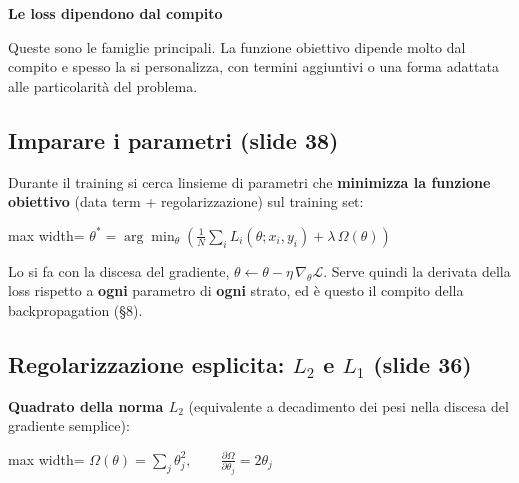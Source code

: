 \documentclass[11pt,a4paper,oneside,openany]{book}
\renewenvironment{quote}{\list{}{\leftmargin=1em\rightmargin=0pt}\item\relax}{\endlist}
\begin{document}
\begin{quote}
\textbf{Le loss dipendono dal compito}
\end{quote}

\begin{quote}
Queste sono le famiglie principali. La funzione obiettivo dipende molto dal compito e spesso la si personalizza, con termini aggiuntivi o una forma adattata alle particolarità del problema.
\end{quote}

\subsection{Imparare i parametri (slide 38)}\label{f01-r667}

Durante il training si cerca l\textquotesingle insieme di parametri che \textbf{minimizza la funzione obiettivo} (data term + regolarizzazione) sul training set:

\begin{center}
\begin{adjustbox}{max width=\linewidth}
$\displaystyle 
\boxed{\theta^* = \arg\min_\theta \left( \frac{1}{N}\sum_i L_i(\theta; x_i, y_i) + \lambda\,\Omega(\theta) \right)}
$
\end{adjustbox}
\end{center}

Lo si fa con la discesa del gradiente, \(\theta \leftarrow \theta - \eta\,\nabla_\theta\mathcal{L}\). Serve quindi la derivata della loss rispetto a \textbf{ogni} parametro di \textbf{ogni} strato, ed è questo il compito della backpropagation (§8).

\subsection{\texorpdfstring{Regolarizzazione esplicita: \(L_2\) e \(L_1\) (slide 36)}{Regolarizzazione esplicita: L\_2 e L\_1 (slide 36)}}\label{f01-r677}

\textbf{Quadrato della norma \(L_2\)} (equivalente a decadimento dei pesi nella discesa del gradiente semplice):

\begin{center}
\begin{adjustbox}{max width=\linewidth}
$\displaystyle 
\Omega(\theta) = \sum_j \theta_j^2, \qquad \frac{\partial\Omega}{\partial\theta_j} = 2\theta_j
$
\end{adjustbox}
\end{center}
\end{document}
